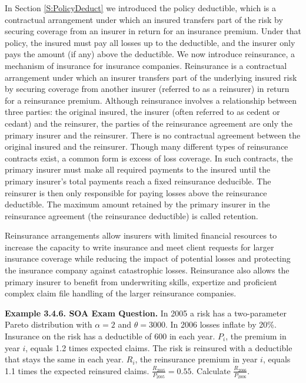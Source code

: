 \documentclass[]{book}
\theoremstyle{definition}
\theoremstyle{definition}
\theoremstyle{definition}
\theoremstyle{remark}
\begin{document}
In Section \ref{S:PolicyDeduct} we introduced the policy deductible,
which is a contractual arrangement under which an insured transfers part
of the risk by securing coverage from an insurer in return for an
insurance premium. Under that policy, the insured must pay all losses up
to the deductible, and the insurer only pays the amount (if any) above
the deductible. We now introduce reinsurance, a mechanism of insurance
for insurance companies. Reinsurance is a contractual arrangement under
which an insurer transfers part of the underlying insured risk by
securing coverage from another insurer (referred to as a reinsurer) in
return for a reinsurance premium. Although reinsurance involves a
relationship between three parties: the original insured, the insurer
(often referred to as cedent or cedant) and the reinsurer, the parties
of the reinsurance agreement are only the primary insurer and the
reinsurer. There is no contractual agreement between the original
insured and the reinsurer. Though many different types of reinsurance
contracts exist, a common form is excess of loss coverage. In such
contracts, the primary insurer must make all required payments to the
insured until the primary insurer's total payments reach a fixed
reinsurance deducible. The reinsurer is then only responsible for paying
losses above the reinsurance deductible. The maximum amount retained by
the primary insurer in the reinsurance agreement (the reinsurance
deductible) is called retention.

Reinsurance arrangements allow insurers with limited financial resources
to increase the capacity to write insurance and meet client requests for
larger insurance coverage while reducing the impact of potential losses
and protecting the insurance company against catastrophic losses.
Reinsurance also allows the primary insurer to benefit from underwriting
skills, expertize and proficient complex claim file handling of the
larger reinsurance companies.

\textbf{Example 3.4.6. SOA Exam Question.} In 2005 a risk has a
two-parameter Pareto distribution with \(\alpha = 2\) and
\(\theta = 3000\). In 2006 losses inflate by 20\%. Insurance on the risk
has a deductible of 600 in each year. \(P_{i}\), the premium in year
\(i\), equals 1.2 times expected claims. The risk is reinsured with a
deductible that stays the same in each year. \(R_{i}\), the reinsurance
premium in year \(i\), equals 1.1 times the expected reinsured claims.
\(\frac{R_{2005}}{P_{2005}} = 0.55\). Calculate
\(\frac{R_{2006}}{P_{2006}}\).
\end{document}
